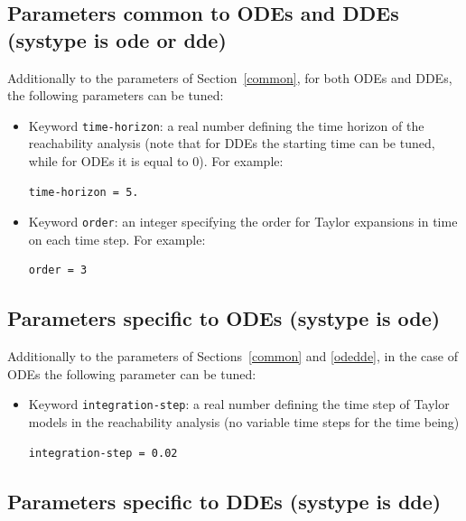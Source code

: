 \documentclass{article}
\begin{document}
\subsection{Parameters common to ODEs and DDEs (systype is ode or dde) \label{odedde}}


Additionally to the parameters of Section~\ref{common},  for both ODEs and DDEs, the following parameters can be tuned:
\begin{itemize}
\item Keyword \texttt{time-horizon}: a real number  defining the time horizon of the reachability analysis (note that for DDEs the starting time can be tuned, while for ODEs it is equal to 0).
For example:
\begin{verbatim}
time-horizon = 5.
\end{verbatim}
\item Keyword \texttt{order}: an integer specifying the order for Taylor expansions in time on each time step. 
For example:
\begin{verbatim}
order = 3
\end{verbatim}

\end{itemize}

\subsection{Parameters specific to ODEs (systype is ode)}

Additionally to the parameters of Sections~\ref{common} and \ref{odedde}, in the case of ODEs the following parameter can be tuned:
\begin{itemize}
\item Keyword \texttt{integration-step}: a real number defining the time step of Taylor models in the reachability analysis (no variable time steps for the time being)
\begin{verbatim}
integration-step = 0.02
\end{verbatim}
\end{itemize}
\subsection{Parameters specific to DDEs (systype is dde)}
\end{document}
